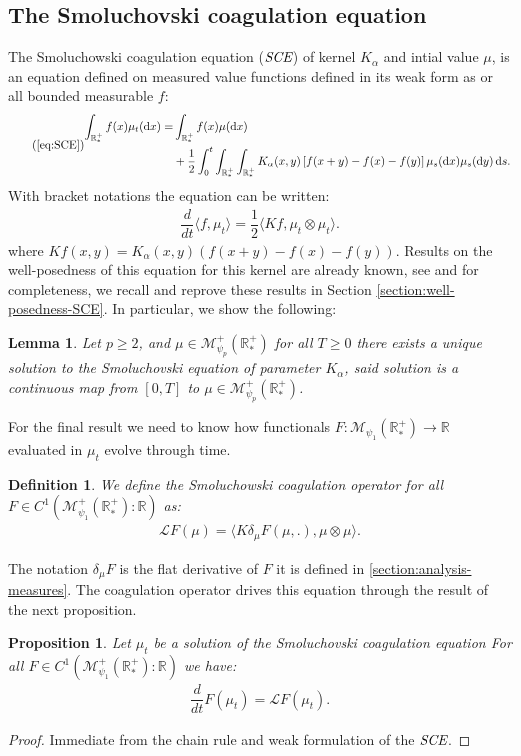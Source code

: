 \documentclass[11pt,a4paper]{article}
\newcommand{\RR}{\mathbb{R}}
\newcommand{\RRP}{\mathbb{R}^+_*}
\newcommand{\MC}{\mathcal{M}}
\newcommand{\LC}{\mathcal{L}}
\newcommand{\SCE}{\emph{SCE}}
\newcommand{\dd}{\mathop{}\!\mathrm{d}}
\newtheorem{lemma}[theorem]{Lemma}
\newtheorem{proposition}[theorem]{Proposition}
\newtheorem{definition}[theorem]{Definition}
\begin{document}
\subsection{The Smoluchovski coagulation equation}
The Smoluchowski coagulation equation ($\SCE$) of kernel $K_\alpha$ and intial value $\mu$, is an equation defined on measured value functions defined in its weak form as or all bounded measurable $f$:
\begin{equation}\tag{\ref{eq:SCE}}
\begin{aligned}
    \int_{\RRP} f(x)\mu_t (\dd x) =& \int_{\RRP} f(x)\mu (\dd x)\\
     &+ \dfrac12\int_0^t \int_{\RRP}\int_{\RRP} 
        K_{\alpha}(x,y)\left[f(x+y) - f(x) - f(y)\right] \mu_s(\dd x)\mu_s(\dd y) \dd s.
\end{aligned}
\end{equation}
With bracket notations the equation can be written:
\begin{align*}
    \dfrac{d}{dt}\langle f,\mu_t \rangle = \dfrac12\langle Kf , \mu_t \otimes \mu_t\rangle.
\end{align*}
where $Kf(x,y) = K_{\alpha}(x,y)\left(f(x+y) - f(x) - f(y) \right)$. Results on the well-posedness of this equation for this kernel are already known, see \cite{norris1999smoluchowski} and for completeness, we recall and reprove these results in Section \ref{section:well-posedness-SCE}. In particular, we show the following:
\begin{lemma}\label{lem:well_posedness_smol_eq}
    Let $p \geq 2$, and $\mu \in \MC_{\psi_p}^+ (\RRP)$ for all $T \geq 0$ there exists a unique solution to the Smoluchovski equation of parameter $K_\alpha$, said solution is a continuous map from $[0,T]$ to $\mu \in \MC_{\psi_p}^+ (\RRP)$.
\end{lemma}
For the final result we need to know how functionals $F : \MC_{\psi_1}(\RRP) \to \RR$ evaluated in $\mu_t$ evolve through time.
\begin{definition}
    We define the Smoluchowski coagulation operator for all $F \in C^1(\MC^+_{\psi_1}\left(\RRP\right):\RR)$ as:
    \begin{align*}
        \LC F(\mu) = \langle K\delta_\mu F(\mu,.) , \mu\otimes \mu\rangle.
    \end{align*}
\end{definition}
The notation $\delta_\mu F$ is the flat derivative of $F$ it is defined in \ref{section:analysis-measures}. The coagulation operator drives this equation through the result of the next proposition.
\begin{proposition}
    Let $\mu_t$ be a solution of the Smoluchovski coagulation equation For all $F \in C^1(\MC_{\psi_1}^+\left(\RRP \right):\RR)$ we have:
    \begin{align*}
        \dfrac{d}{dt} F( \mu_t) = \LC F(\mu_t).
    \end{align*}
\end{proposition}
\begin{proof}
    Immediate from the chain rule and weak formulation of the $\SCE$.
\end{proof}
    
\end{document}
